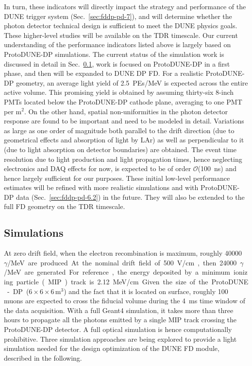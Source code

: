 In turn, these indicators will directly impact the strategy and performance of the DUNE trigger system (Sec.~\ref{sec:fddp-pd-7}), and will determine whether the photon detector technical design is sufficient to meet the DUNE physics goals. These higher-level studies will be available on the TDR timescale. Our current understanding of the performance indicators listed above is largely based on ProtoDUNE-DP simulations. The current status of the simulation work is discussed in detail in Sec.~\ref{sec:fddp-pd-6.1}, work is focused on ProtoDUNE-DP in a first phase, and then will be expanded to DUNE DP FD. For a realistic ProtoDUNE-DP geometry, an average light yield of \SI{2.5}{PEs/MeV} is expected across the entire active volume. This promising yield is obtained  by assuming thirty-six 8-inch PMTs located below the ProtoDUNE-DP cathode plane, averaging to one PMT per m$^2$. On the other hand, spatial non-uniformities in the photon detector response are found to be important and need to be modeled in detail. Variations as large as one order of magnitude both parallel to the drift direction (due to geometrical effects and absorption of light by LAr) as well as perpendicular to it (due to light absorption on detector boundaries) are obtained. The event time resolution due to light production and light propagation times, hence neglecting electronics and DAQ effects for now, is expected to be of order $\mathcal{O}$(\SI{100}{ns}) and hence largely sufficient for our purposes. These initial low-level performance estimates will be refined with more realistic simulations and with ProtoDUNE-DP data (Sec.~\ref{sec:fddp-pd-6.2}) in the future. They will also be extended to the full FD geometry on the TDR timescale.

\subsection{Simulations}
\label{sec:fddp-pd-6.1}

At zero drift field, when the electron recombination is maximum, roughly \SI{40000}{$\gamma$/MeV} are produced. At the nominal drift field of \SI{500}{V/cm}, then \num{24000}{$\gamma$/MeV} are generated. For reference, the energy deposited by a minimum ionizing particle (MIP) track is \SI{2.12}{MeV/cm}. Given the size of the ProtoDUNE-DP ($6\times6\times6$\,m$^3$) and the fact that it is located on surface, roughly \num{100} muons are expected to cross the fiducial volume during the \SI{4}{ms} time window of the data acquisition. With a full Geant4 \cite{geant4} simulation, it takes more than three hours to propagate all the photons emitted by a single MIP track crossing the ProtoDUNE-DP detector. A full optical simulation is hence computationally prohibitive. Three simulation approaches are being explored to provide a light simulation needed for the design optimization of the DUNE FD module, described in the following.


